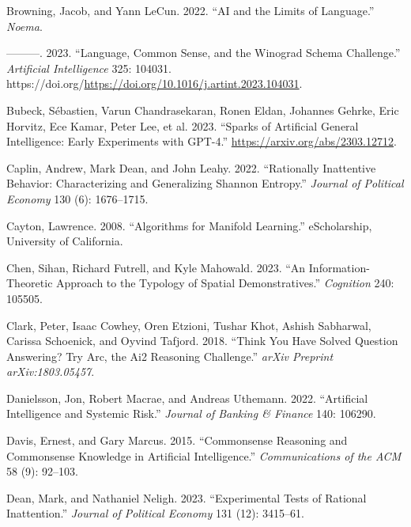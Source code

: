 \documentclass[
]{article}
\newlength{\cslhangindent}
\newenvironment{CSLReferences}[2] %
 {\begin{list}{}{%
  \setlength{\itemindent}{0pt}
  \setlength{\leftmargin}{0pt}
  \setlength{\parsep}{0pt}
  \ifodd #1
   \setlength{\leftmargin}{\cslhangindent}
   \setlength{\itemindent}{-1\cslhangindent}
  \fi
  \setlength{\itemsep}{#2\baselineskip}}}
 {\end{list}}
\theoremstyle{plain}
\theoremstyle{definition}
\theoremstyle{remark}
\begin{document}
\begin{CSLReferences}{1}{0}
Browning, Jacob, and Yann LeCun. 2022. {``AI and the Limits of
Language.''} \emph{Noema}.

---------. 2023. {``Language, Common Sense, and the Winograd Schema
Challenge.''} \emph{Artificial Intelligence} 325: 104031.
https://doi.org/\url{https://doi.org/10.1016/j.artint.2023.104031}.

Bubeck, Sébastien, Varun Chandrasekaran, Ronen Eldan, Johannes Gehrke,
Eric Horvitz, Ece Kamar, Peter Lee, et al. 2023. {``Sparks of Artificial
General Intelligence: Early Experiments with GPT-4.''}
\url{https://arxiv.org/abs/2303.12712}.

Caplin, Andrew, Mark Dean, and John Leahy. 2022. {``Rationally
Inattentive Behavior: Characterizing and Generalizing Shannon
Entropy.''} \emph{Journal of Political Economy} 130 (6): 1676--1715.

Cayton, Lawrence. 2008. {``Algorithms for Manifold Learning.''}
eScholarship, University of California.

Chen, Sihan, Richard Futrell, and Kyle Mahowald. 2023. {``An
Information-Theoretic Approach to the Typology of Spatial
Demonstratives.''} \emph{Cognition} 240: 105505.

Clark, Peter, Isaac Cowhey, Oren Etzioni, Tushar Khot, Ashish Sabharwal,
Carissa Schoenick, and Oyvind Tafjord. 2018. {``Think You Have Solved
Question Answering? Try Arc, the Ai2 Reasoning Challenge.''} \emph{arXiv
Preprint arXiv:1803.05457}.

Danielsson, Jon, Robert Macrae, and Andreas Uthemann. 2022.
{``Artificial Intelligence and Systemic Risk.''} \emph{Journal of
Banking \& Finance} 140: 106290.

Davis, Ernest, and Gary Marcus. 2015. {``Commonsense Reasoning and
Commonsense Knowledge in Artificial Intelligence.''}
\emph{Communications of the ACM} 58 (9): 92--103.

Dean, Mark, and Nathaniel Neligh. 2023. {``Experimental Tests of
Rational Inattention.''} \emph{Journal of Political Economy} 131 (12):
3415--61.


\end{CSLReferences}
\end{document}
